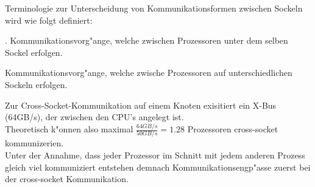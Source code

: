 Terminologie zur Unterscheidung von Kommunikationsformen zwischen Sockeln wird wie folgt definiert:\\
\begin{defi}.
Kommunikationsvorg"ange, welche zwischen Prozessoren unter dem selben Sockel erfolgen.
\end{defi}
\begin{defi}
Kommunikationsvorg"ange, welche zwische Prozessoren auf unterschiedlichen Sockeln erfolgen.
\end{defi}
Zur Cross-Socket-Kommunikation auf einem Knoten exisitiert ein X-Bus (64GB/s), der zwischen den CPU's angelegt ist.\\
Theoretisch k"onnen also maximal $\frac{64GB/s}{50GB/s} = 1.28$ Prozessoren cross-socket kommunizerien.\\
Unter der Annahme, dass jeder Prozessor im Schnitt mit jedem anderen Prozess gleich viel kommuniziert  entstehen demnach Kommunikationsengp"asse zuerst bei der cross-socket Kommunikation.\\

